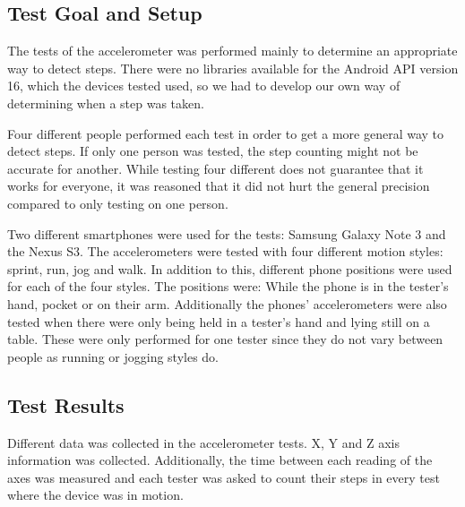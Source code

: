 \subsection{Test Goal and Setup}
The tests of the accelerometer was performed mainly to determine an appropriate way to detect steps. There were no libraries available for the Android API version 16, which the devices tested used, so we had to develop our own way of determining when a step was taken.

Four different people performed each test in order to get a more general way to detect steps. If only one person was tested, the step counting might not be accurate for another. While testing four different does not guarantee that it works for everyone, it was reasoned that it did not hurt the general precision compared to only testing on one person. 

Two different smartphones were used for the tests: Samsung Galaxy Note 3 and the Nexus S3. The accelerometers were tested with four different motion styles: sprint, run, jog and walk. In addition to this, different phone positions were used for each of the four styles. The positions were: While the phone is in the tester's hand, pocket or on their arm.
Additionally the phones' accelerometers were also tested when there were only being held in a tester's hand and lying still on a table. These were only performed for one tester since they do not vary between people as running or jogging styles do.

\subsection{Test Results}
Different data was collected in the accelerometer tests. X, Y and Z axis information was collected. Additionally, the time between each reading of the axes was measured and each tester was asked to count their steps in every test where the device was in motion. 

